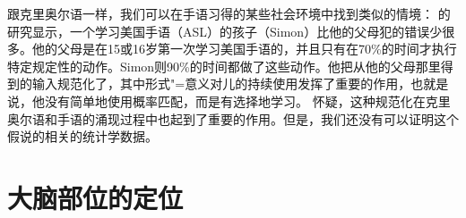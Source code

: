跟克里奥尔语一样，我们可以在手语习得的某些社会环境中找到类似的情境： \citet{SN2004a}的研究显示，一个学习美国手语（ASL）的孩子（Simon）比他的父母犯的错误少很多。他的父母是在15或16岁第一次学习美国手语的，并且只有在70\%的时间才执行特定规定性的动作。Simon则90\%的时间都做了这些动作。他把从他的父母那里得到的输入规范化了，其中形式"=意义对儿的持续使用发挥了重要的作用，也就是说，他没有简单地使用概率匹配，而是有选择地学习。 \citet[]{SN2004a}怀疑，这种规范化在克里奥尔语和手语的涌现过程中也起到了重要的作用。但是，我们还没有可以证明这个假说的相关的统计学数据。


\section{大脑部位的定位}

